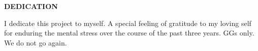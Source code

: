 \thispagestyle{empty}

\begin{center}
\textbf{DEDICATION}
\end{center}

\smallskip

I dedicate this project to myself. A special feeling of gratitude to my loving self for enduring the mental stress over the course of the past three years. GGs only. We do not go again.



